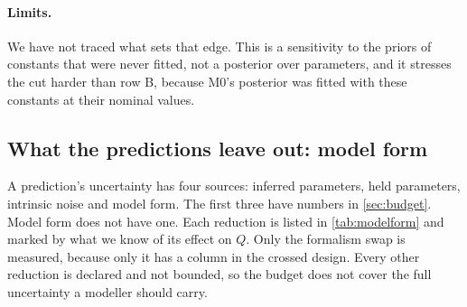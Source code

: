 \paragraph{Limits.} We have not traced what sets that edge. This is a sensitivity to the priors of constants that were
never fitted, not a posterior over  parameters, and it stresses the cut harder
than row B, because M0's posterior was fitted with these constants at their nominal values.

\subsection{What the predictions leave out: model form}
\label{sec:modelform}

A prediction's uncertainty has four sources: inferred parameters, held parameters,
intrinsic noise and model form. The first three have numbers in \cref{sec:budget}. Model
form does not have one. Each reduction is listed in \cref{tab:modelform} and marked by
what we know of its effect on $Q$. Only the formalism swap is measured, because only it
has a column in the crossed design. Every other reduction is declared and not bounded, so
the budget does not cover the full uncertainty a modeller should carry.

